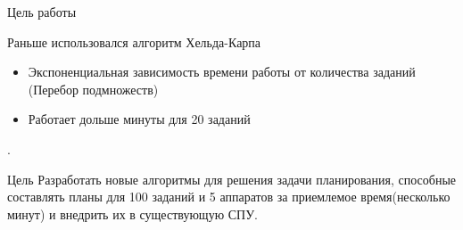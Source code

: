 \documentclass{beamer}
\begin{document}
\begin{frame}{Цель работы}

Раньше использовался алгоритм Хельда-Карпа
\begin{itemize}
\item Экспоненциальная зависимость времени работы от количества заданий (Перебор подмножеств)
\item Работает дольше минуты для 20 заданий
\end{itemize}
.
\begin{block}{Цель}
Разработать новые алгоритмы для решения задачи планирования, способные составлять планы для 100 заданий и 5 аппаратов за приемлемое время(несколько минут) и внедрить их в существующую СПУ.
\end{block}

\end{frame}

\end{document}
